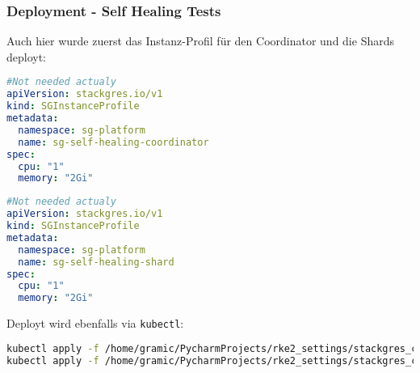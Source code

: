 \subsubsection{Deployment - Self Healing Tests}
Auch hier wurde zuerst das Instanz-Profil für den Coordinator und die Shards deployt:
\lstset{style=gra_codestyle}
\begin{lstlisting}[language=yaml, caption=StackGres-Citus - Self Healing Testing - SGInstanceProfile Coordinator,captionpos=b,label={lst:SGInstanceProfile_self_healing_coord.yaml},breaklines=true]
#Not needed actualy
apiVersion: stackgres.io/v1
kind: SGInstanceProfile
metadata:
  namespace: sg-platform
  name: sg-self-healing-coordinator
spec:
  cpu: "1"
  memory: "2Gi"
\end{lstlisting}
\lstset{style=gra_codestyle}
\begin{lstlisting}[language=yaml, caption=StackGres-Citus - Self Healing Testing - SGInstanceProfile Shard,captionpos=b,label={lst:SGInstanceProfile_self_healing_shard.yaml},breaklines=true]
#Not needed actualy
apiVersion: stackgres.io/v1
kind: SGInstanceProfile
metadata:
  namespace: sg-platform
  name: sg-self-healing-shard
spec:
  cpu: "1"
  memory: "2Gi"
\end{lstlisting}

Deployt wird ebenfalls via \texttt{kubectl}:
\lstset{style=gra_codestyle}
\begin{lstlisting}[language=bash, caption=StackGres-Citus - Self Healing Testing - Instanz-Profil Deploy,captionpos=b,label={lst:stackgres_citus-self-healing-testing-deploy-instance-profiles},breaklines=true]
kubectl apply -f /home/gramic/PycharmProjects/rke2_settings/stackgres_citus/stackgres_citus/SGInstanceProfile_self_healing_coord.yaml
kubectl apply -f /home/gramic/PycharmProjects/rke2_settings/stackgres_citus/stackgres_citus/SGInstanceProfile_self_healing_shard.yaml
\end{lstlisting}

